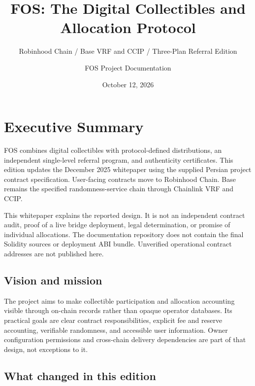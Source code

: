 \documentclass[
  10pt,
  letterpaper,
]{article}
\title{FOS: The Digital Collectibles and Allocation Protocol}
\subtitle{Robinhood Chain / Base VRF and CCIP / Three-Plan Referral
Edition}
\author{FOS Project Documentation}
\date{October 12, 2026}
\begin{document}
\maketitle

{
\hypersetup{linkcolor=}
\setcounter{tocdepth}{1}
\tableofcontents
\clearpage
}
\section{Executive Summary}\label{executive-summary}

FOS combines digital collectibles with protocol-defined distributions,
an independent single-level referral program, and authenticity
certificates. This edition updates the December 2025 whitepaper using
the supplied Persian project contract specification. User-facing
contracts move to Robinhood Chain. Base remains the specified
randomness-service chain through Chainlink VRF and CCIP.

This whitepaper explains the reported design. It is not an independent
contract audit, proof of a live bridge deployment, legal determination,
or promise of individual allocations. The documentation repository does
not contain the final Solidity sources or deployment ABI bundle.
Unverified operational contract addresses are not published here.

\subsection{Vision and mission}\label{vision-and-mission}

The project aims to make collectible participation and allocation
accounting visible through on-chain records rather than opaque operator
databases. Its practical goals are clear contract responsibilities,
explicit fee and reserve accounting, verifiable randomness, and
accessible user information. Owner configuration permissions and
cross-chain delivery dependencies are part of that design, not
exceptions to it.

\subsection{What changed in this
edition}\label{what-changed-in-this-edition}
\end{document}
